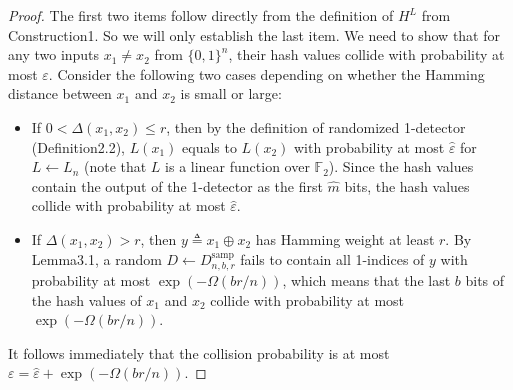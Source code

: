 \documentclass[10pt,a4paper]{article}
\begin{document}
\begin{proof}
The first two items follow directly from the definition of $H^L$ from Construction1. So we will only establish the last item. We need to show that for any two inputs $x_1\ne x_2$ from $\{0,1\}^n$, their hash values collide with probability at most $\varepsilon$.
Consider the following two cases depending on whether the Hamming distance between $x_1$ and $x_2$ is small or large:
\begin{itemize}
\item If $0<\Delta(x_1,x_2)\le r$, then by the definition of randomized 1-detector (Definition2.2), $L(x_1)$ equals to $L(x_2)$ with probability at most $\hat\varepsilon$ for $L\leftarrow L_n$ (note that $L$ is a linear function over $\mathbb F_2$). Since the hash values contain the output of the 1-detector as the first $\hat m$ bits, the hash values collide with probability at most $\hat\varepsilon$.
\item If $\Delta(x_1,x_2)>r$, then $y\triangleq x_1\oplus x_2$ has Hamming weight at least $r$. By Lemma3.1, a random $D\leftarrow D^{\mathrm{samp}}_{n,b,r}$ fails to contain all 1-indices of $y$ with probability at most $\exp(-\Omega(br/n))$, which means that the last $b$ bits of the hash values of $x_1$ and $x_2$ collide with probability at most $\exp(-\Omega(br/n))$.
\end{itemize}
It follows immediately that the collision probability is at most $\varepsilon=\hat\varepsilon+\exp(-\Omega(br/n))$.
\end{proof}
\end{document}
